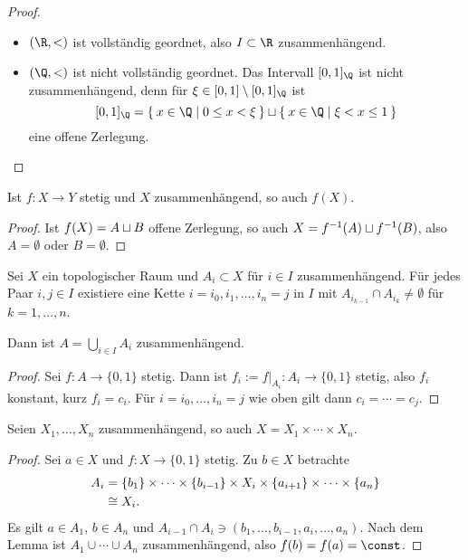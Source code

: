 \begin{proof}
	\begin{itemize}
		\item
			$(\R, <)$ ist vollständig geordnet, also $I \subset \R$ zusammenhängend.
		\item
			$(\Q, <)$ ist nicht vollständig geordnet.
			Das Intervall $[0,1]_\Q$ ist nicht zusammenhängend, denn für $\xi \in [0,1] \setminus [0,1]_\Q$ ist
			\[
				[0,1]_\Q =
				\Set{ x \in \Q | 0 \le x < \xi }
				\dunion
				\Set{ x \in \Q | \xi < x \le 1 }
			\]
			eine offene Zerlegung.
	\end{itemize}
\end{proof}

\begin{st}
	Ist $f: X \to Y$ stetig und $X$ zusammenhängend, so auch $f(X)$.
	\begin{proof}
		Ist $f(X) = A \sqcup B$ offene Zerlegung, so auch $X = f^{-1}(A) \sqcup f^{-1}(B)$, also $A = \emptyset$ oder $B = \emptyset$.
	\end{proof}
\end{st}

\begin{lem}
	Sei $X$ ein topologischer Raum und $A_i \subset X$ für $i \in I$ zusammenhängend.
	Für jedes Paar $i,j \in I$ existiere eine Kette $i = i_0 , i_1, \dotsc, i_n = j$ in $I$ mit $A_{i_{k-1}} \cap A_{i_k} \neq \emptyset$ für $k = 1, \dotsc, n$.

	Dann ist $A = \bigcup_{i\in I} A_i$ zusammenhängend.
	\begin{proof}
		Sei $f: A \to \{0,1\}$ stetig.
		Dann ist $f_i := f|_{A_i}: A_i \to \{0,1\}$ stetig, also $f_i$ konstant, kurz $f_i = c_i$.
		Für $i = i_0, \dotsc, i_n = j$ wie oben gilt dann $c_i = \dotsb = c_j$.
	\end{proof}
\end{lem}

\begin{lem}
	Seien $X_1, \dotsc, X_n$ zusammenhängend, so auch $X = X_1 \times \dotsb \times X_n$.
	\begin{proof}
		Sei $a \in X$ und $f: X \to \{0,1\}$ stetig.
		Zu $b \in X$ betrachte
		\begin{align*}
			A_i &= \{ b_1 \} \times \dotsb \times \{b_{i-1}\} \times X_i \times \{a_{i+1}\} \times \dotsb \times \{a_n\} \\
			&\cong X_i.
		\end{align*}
		Es gilt $a \in A_1$, $b \in A_n$ und $A_{i-1} \cap A_i \ni (b_1, \dotsc, b_{i-1}, a_i, \dotsc, a_n)$.
		Nach dem Lemma ist $A_1 \cup \dotsb \cup A_n$ zusammenhängend, also $f(b) = f(a) = \const$.
	\end{proof}
\end{lem}

